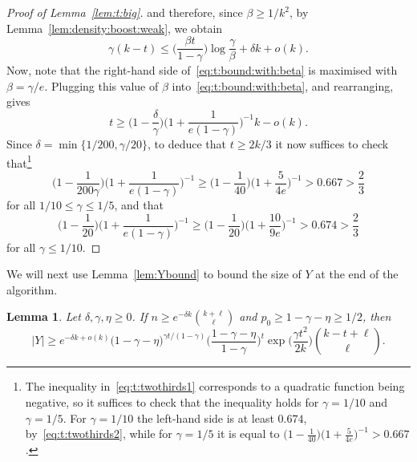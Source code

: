 \documentclass[12pt,reqno]{amsart}
\newtheorem{lemma}[theorem]{Lemma}
\theoremstyle{definition}
\theoremstyle{remark}
\renewcommand{\le}{\leqslant}
\renewcommand{\ge}{\geqslant}
\begin{document}
\begin{proof}[Proof of Lemma~\ref{lem:t:big}]
\noindent and therefore, since $\beta \ge 1/k^2$, by Lemma~\ref{lem:density:boost:weak}, we obtain
\begin{equation}\label{eq:t:bound:with:beta}
\gamma(k - t) \le \bigg( \frac{\beta t}{1 - \gamma} \bigg) \log \frac{\gamma}{\beta} + \delta k + o(k). 
\end{equation}
Now, note that the right-hand side of~\eqref{eq:t:bound:with:beta} is maximised with $\beta = \gamma / e$. Plugging this value of $\beta$ into~\eqref{eq:t:bound:with:beta}, and rearranging, gives 
$$t \ge \bigg( 1 - \frac{\delta}{\gamma} \bigg) \bigg( 1 + \frac{1}{e(1 - \gamma)} \bigg)^{-1} k - o(k).$$
Since $\delta = \min\big\{ 1/200, \gamma/20 \big\}$, to deduce that $t \ge 2k/3$ it now suffices to check that\footnote{The inequality in~\eqref{eq:t:twothirds1} corresponds to a quadratic function being negative, so it suffices to check that the inequality holds for $\gamma = 1/10$ and $\gamma = 1/5$. For $\gamma = 1/10$ the left-hand side is at least $0.674$, by~\eqref{eq:t:twothirds2}, while for $\gamma = 1/5$ it is equal to $\big(1 - \frac{1}{40} \big)\big(1 + \frac{5}{4e} \big)^{-1} > 0.667$.}
\begin{equation}\label{eq:t:twothirds1}
\bigg( 1 - \frac{1}{200\gamma} \bigg)\bigg( 1 + \frac{1}{e(1-\gamma)} \bigg)^{-1} \ge \bigg(1 - \frac{1}{40} \bigg)\bigg(1 + \frac{5}{4e} \bigg)^{-1} > 0.667 > \frac{2}{3}
\end{equation}
for all $1/10 \le \gamma \le 1/5$, and that 
\begin{equation}\label{eq:t:twothirds2}
\bigg( 1 - \frac{1}{20} \bigg)\bigg( 1 + \frac{1}{e(1-\gamma)} \bigg)^{-1} \ge \bigg(1 - \frac{1}{20} \bigg)\bigg(1 + \frac{10}{9e} \bigg)^{-1} > 0.674 > \frac{2}{3}
\end{equation}
for all $\gamma \le 1/10$. 
\end{proof}

We will next use Lemma~\ref{lem:Ybound} to bound the size of $Y$ at the end of the algorithm. 

\begin{lemma}\label{lem:size:of:Y}
Let $\delta,\gamma,\eta \ge 0$. If\/ $n \ge e^{-\delta k} {k + \ell \choose \ell}$ and\/ $p_0 \ge 1 - \gamma - \eta \ge 1/2$, then 
$$|Y| \ge e^{-\delta k + o(k)} \big( 1 - \gamma - \eta \big)^{\gamma t / (1 - \gamma)} \bigg( \frac{1 - \gamma - \eta}{1 - \gamma} \bigg)^t \exp\bigg( \frac{\gamma t^2}{2k} \bigg) {k-t+\ell \choose \ell}.$$
\end{lemma}
\end{document}
